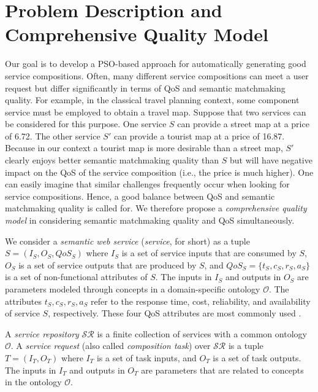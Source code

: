 \documentclass{llncs}
\begin{document}
\section{Problem Description and Comprehensive Quality Model}\label{Motivation and Problem Description}

Our goal is to develop a PSO-based approach for automatically generating good service compositions. Often, many different service compositions can meet a user request but differ significantly in terms of QoS and semantic matchmaking quality. For example, in the classical travel planning context, some component service must be employed to obtain a travel map. Suppose that two services can be considered for this purpose. One service $S$ can provide a street map at a price of 6.72. The other service $S'$ can provide a tourist map at a price of 16.87. Because in our context a tourist map is more desirable than a street map, $S'$ clearly enjoys better semantic matchmaking quality than $S$ but will have negative impact on the QoS of the service composition (i.e., the price is much higher). One can easily imagine that similar challenges frequently occur when looking for service compositions. Hence, a good balance between QoS and semantic matchmaking quality is called for. We therefore propose a \emph{comprehensive quality model} in considering semantic matchmaking quality and QoS simultaneously.

We consider a \emph{semantic web service} (\emph{service}, for short) as a tuple $S = (I_{S}, O_{S}, QoS_S)$ where $I_{S}$ is a set of service inputs that are consumed by $S$, $O_{S}$ is a set of service outputs that are produced by $S$, and $QoS_{S}=\{t_S, c_S, r_S, a_S\}$ is a set of non-functional attributes of $S$. The inputs in $I_{S}$ and outputs in $O_{S}$ are parameters modeled through concepts in a domain-specific ontology $\mathcal{O}$. The attributes $t_S, c_S, r_S, a_S$ refer to the response time, cost, reliability, and availability of service $S$, respectively. These four QoS attributes are most commonly used \cite{zeng2003quality}.

A \emph{service repository} $\mathcal{SR}$ is a finite collection of services with a common ontology $\mathcal{O}$. A \emph{service request} (also called \emph{composition task}) over $\mathcal{SR}$ is a tuple $T=(I_{T}, O_{T})$ where $I_{T}$ is a set of task inputs, and $O_{T}$ is a set of task outputs. The inputs in $I_{T}$ and outputs in $O_{T}$ are parameters that are related to concepts in the ontology $\mathcal{O}$.
\end{document}
